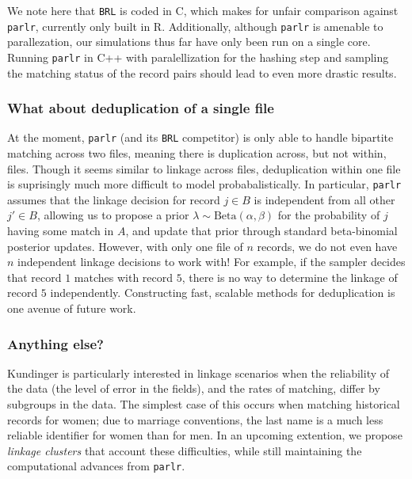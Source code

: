 \documentclass[
  12pt,
]{article}
\begin{document}
We note here that \texttt{BRL} is coded in C, which makes for unfair
comparison against \texttt{parlr}, currently only built in R.
Additionally, although \texttt{parlr} is amenable to parallezation, our
simulations thus far have only been run on a single core. Running
\texttt{parlr} in C++ with paralellization for the hashing step and
sampling the matching status of the record pairs should lead to even
more drastic results.

\hypertarget{what-about-deduplication-of-a-single-file}{%
\subsubsection{What about deduplication of a single
file}\label{what-about-deduplication-of-a-single-file}}

At the moment, \texttt{parlr} (and its \texttt{BRL} competitor) is only
able to handle bipartite matching across two files, meaning there is
duplication across, but not within, files. Though it seems similar to
linkage across files, deduplication within one file is suprisingly much
more difficult to model probabalistically. In particular, \texttt{parlr}
assumes that the linkage decision for record \(j \in B\) is independent
from all other \(j' \in B\), allowing us to propose a prior
\(\lambda \sim \text{Beta}(\alpha, \beta)\) for the probability of \(j\)
having some match in \(A\), and update that prior through standard
beta-binomial posterior updates. However, with only one file of \(n\)
records, we do not even have \(n\) independent linkage decisions to work
with! For example, if the sampler decides that record \(1\) matches with
record \(5\), there is no way to determine the linkage of record \(5\)
independently. Constructing fast, scalable methods for deduplication is
one avenue of future work.

\hypertarget{anything-else}{%
\subsubsection{Anything else?}\label{anything-else}}

Kundinger is particularly interested in linkage scenarios when the
reliability of the data (the level of error in the fields), and the
rates of matching, differ by subgroups in the data. The simplest case of
this occurs when matching historical records for women; due to marriage
conventions, the last name is a much less reliable identifier for women
than for men. In an upcoming extention, we propose \emph{linkage
clusters} that account these difficulties, while still maintaining the
computational advances from \texttt{parlr}.
\end{document}
